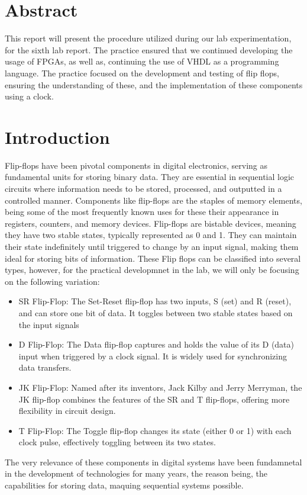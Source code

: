 \documentclass[12pt]{article}  %
\begin{document}
\section{Abstract} %
This report will present the procedure utilized during our lab experimentation, for the sixth lab report. The practice ensured that we continued developing the usage of  
FPGAs, as well as, continuing the use of VHDL as a programming language. The practice focused on the development and testing of flip flops, ensuring the understanding of these, and the implementation of these components using a clock.
\section{Introduction} %
Flip-flops have been pivotal components in digital electronics, serving as fundamental units for storing binary data. They are essential in sequential logic circuits where information needs to be stored, processed, and outputted in a controlled manner. \cite{MathiarasuFlipFlops}
Components like flip-flops are the staples of memory elements, being some of the most frequently known uses for these their appearance in registers, counters, and memory devices. 
Flip-flops are bistable devices, meaning they have two stable states, typically represented as 0 and 1. They can maintain their state indefinitely until triggered to change by an input signal, making them ideal for storing bits of information.
These Flip flops can be classified into several types, however, for the practical developmnet in the lab, we will only be focusing on the following variation:
\begin{itemize}
  \item SR Flip-Flop: The Set-Reset flip-flop has two inputs, S (set) and R (reset), and can store one bit of data. It toggles between two stable states based on the input signals
  \item D Flip-Flop: The Data flip-flop captures and holds the value of its D (data) input when triggered by a clock signal. It is widely used for synchronizing data transfers.
  \item JK Flip-Flop: Named after its inventors, Jack Kilby and Jerry Merryman, the JK flip-flop combines the features of the SR and T flip-flops, offering more flexibility in circuit design.
  \item T Flip-Flop: The Toggle flip-flop changes its state (either 0 or 1) with each clock pulse, effectively toggling between its two states.
\end{itemize}\cite{MathiarasuFlipFlops}
The very relevance of these components in digital systems have been fundamnetal in the development of technologies for many years, the reason being, the capabilities for storing data, maquing sequential systems possible. 
\end{document}
